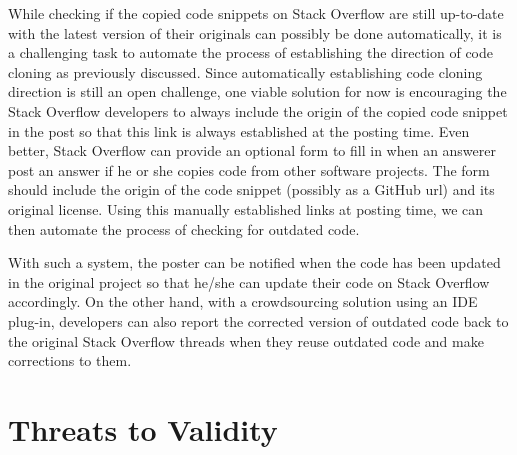 \documentclass[10pt,journal,compsoc]{IEEEtran}
\begin{document}
While checking if the copied code snippets on Stack Overflow are still
up-to-date with the latest version of their originals can possibly be done
automatically, it is a challenging task to automate the process of establishing
the direction of code cloning as previously discussed. 
Since automatically establishing code cloning direction
is still an open challenge, one viable solution for now is
encouraging the Stack Overflow developers to always include the origin of the
copied code snippet in the post so that this link is always established at the
posting time. Even better, Stack Overflow can provide an optional form to fill
in when an answerer post an answer if he or she copies code from other software
projects. The form should include the origin of the code snippet (possibly as a
GitHub url) and its original license. Using this manually established links at
posting time, we can then automate the process of checking for outdated code.

With such a system, the poster can be notified when the code has been updated in
the original project so that he/she can update their code on Stack Overflow
accordingly. On the other hand, with a crowdsourcing solution using an IDE
plug-in, developers can also report the corrected version of outdated code back
to the original Stack Overflow threads when they reuse outdated code and make
corrections to them.



\section{Threats to Validity}
\end{document}
